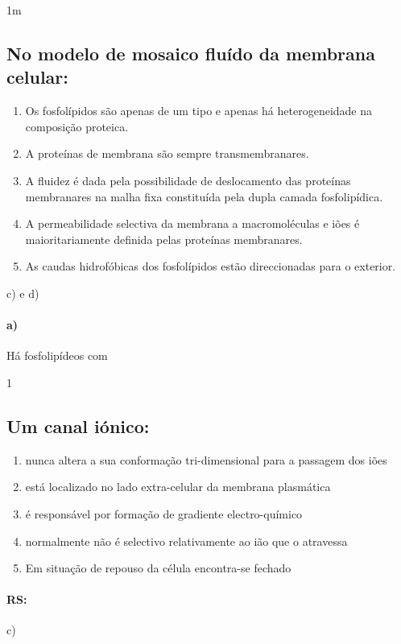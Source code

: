 \documentclass[\mainfilename]{subfiles}
\begin{document}
\begin{questionBox}1m{} %
    
    \subsection*{No modelo de mosaico fluído da membrana celular:}

    \begin{enumerate}[label=\alph{enumi})]
        \item Os fosfolípidos são apenas de um tipo e apenas há heterogeneidade na composição proteica.
        \item A proteínas de membrana são sempre transmembranares.
        \item A fluidez é dada pela possibilidade de deslocamento das proteínas membranares na malha fixa constituída pela dupla camada fosfolipídica.
        \item A permeabilidade selectiva da membrana a macromoléculas e iões é maioritariamente definida pelas proteínas membranares.
        \item As caudas hidrofóbicas dos fosfolípidos estão direccionadas para o exterior.
    \end{enumerate}

    \begin{answerBox}{c) e d)} %
        \paragraph*{a)} Há fosfolipídeos com 
    \end{answerBox}
    
\end{questionBox}

\begin{questionBox}1{} %
    
    \subsection*{Um canal iónico:}
    \begin{enumerate}[label=\alph{enumi})]
        \item nunca altera a sua conformação tri-dimensional para a passagem dos iões 
        \item está localizado no lado extra-celular da membrana plasmática
        \item é responsável por formação de gradiente electro-químico
        \item normalmente não é selectivo relativamente ao ião que o atravessa
        \item Em situação de repouso da célula encontra-se fechado
    \end{enumerate}

    \paragraph*{RS:} c)
    
\end{questionBox}
\end{document}
